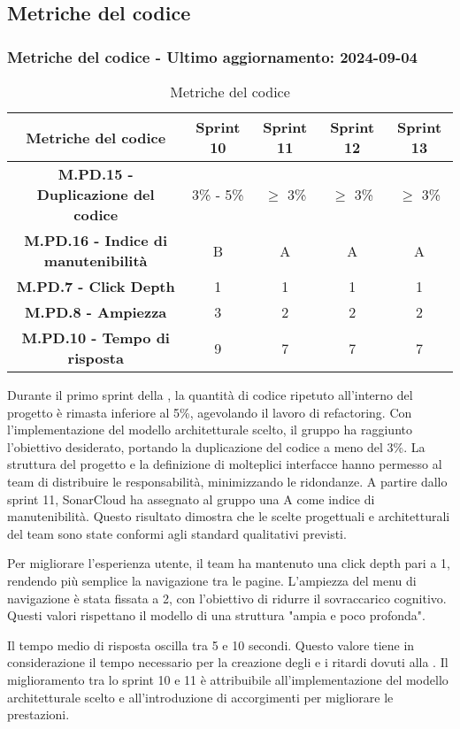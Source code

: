 \subsection{Metriche del codice}

\subsubsection*{Metriche del codice - Ultimo aggiornamento: 2024-09-04}

\begin{table}[H]
  \centering
  \begin{tabular}{|c|c|c|c|c|}
      \hline
      Metriche del codice & \textbf{Sprint 10} & \textbf{Sprint 11} & \textbf{Sprint 12}  & \textbf{Sprint 13} \\
      \hline
      \textbf{M.PD.15 - Duplicazione del codice} & 3\% - 5\% & $\ge$ 3\% & $\ge$ 3\% & $\ge$ 3\% \\
      \hline
      \textbf{M.PD.16 - Indice di manutenibilità} & B & A & A & A \\
      \hline
      \textbf{M.PD.7 - Click Depth} & 1 & 1 & 1 & 1 \\
      \hline
      \textbf{M.PD.8 - Ampiezza} & 3 & 2 & 2 & 2 \\
      \hline
      \textbf{M.PD.10 - Tempo di risposta } & 9 & 7 & 7 & 7 \\
      \hline
  \end{tabular}
  \caption{Metriche del codice}
\end{table}

\par Durante il primo sprint della , la quantità di codice ripetuto all'interno del progetto è rimasta inferiore al 5\%, agevolando il lavoro di refactoring. Con l'implementazione del modello architetturale scelto, il gruppo ha raggiunto l'obiettivo desiderato, portando la duplicazione del codice a meno del 3\%. La struttura del progetto e la definizione di molteplici interfacce hanno permesso al team di distribuire le responsabilità, minimizzando le ridondanze. A partire dallo sprint 11, SonarCloud ha assegnato al gruppo una A come indice di manutenibilità. Questo risultato dimostra che le scelte progettuali e architetturali del team sono state conformi agli standard qualitativi previsti.

\par Per migliorare l'esperienza utente, il team ha mantenuto una click depth pari a 1, rendendo più semplice la navigazione tra le pagine. L'ampiezza del menu di navigazione è stata fissata a 2, con l'obiettivo di ridurre il sovraccarico cognitivo. Questi valori rispettano il modello di una struttura "ampia e poco profonda".

\par Il tempo medio di risposta oscilla tra 5 e 10 secondi. Questo valore tiene in considerazione il tempo necessario per la creazione degli  e i ritardi dovuti alla . Il miglioramento tra lo sprint 10 e 11 è attribuibile all'implementazione del modello architetturale scelto e all'introduzione di accorgimenti per migliorare le prestazioni.
